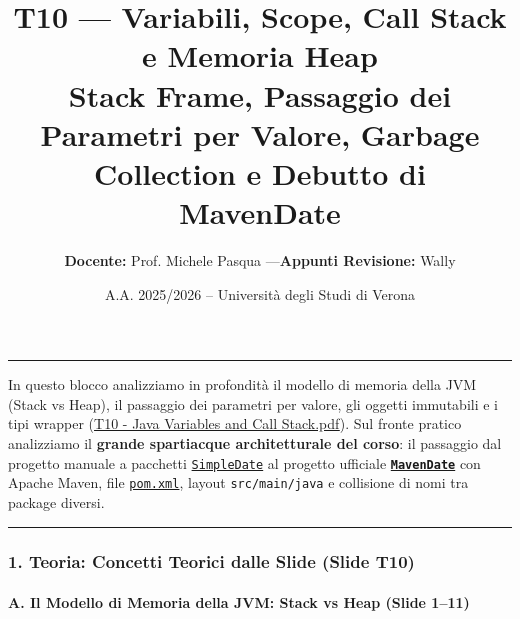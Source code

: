 \documentclass[11pt,a4paper]{article}
\title{\Huge\bfseries\sffamily\color{brandblue} T10 --- Variabili, Scope, Call Stack e Memoria Heap \\[0.3em] \large\sffamily Stack Frame, Passaggio dei Parametri per Valore, Garbage Collection e Debutto di MavenDate}
\author{\textbf{Docente:} Prof. Michele Pasqua \quad---\quad \textbf{Appunti Revisione:} Wally}
\date{A.A. 2025/2026 -- Universit\`a degli Studi di Verona}
\newcommand{\passthrough}[1]{#1}
\begin{document}
\maketitle
\thispagestyle{fancy}
\vspace{-1.2em}
\noindent\textcolor{brandblue}{\rule{\textwidth}{0.8pt}}
\vspace{1.2em}

In questo blocco analizziamo in profondità il modello di memoria della
JVM (Stack vs Heap), il passaggio dei parametri per valore, gli oggetti
immutabili e i tipi wrapper
(\href{file:///home/wally/Documenti/GitHub/Programmazione-II/25-26/Teoria-e-Esercitazioni/Slides-20260902/T10\%20-\%20Java\%20Variables\%20and\%20Call\%20Stack.pdf}{T10
- Java Variables and Call Stack.pdf}). Sul fronte pratico analizziamo il
\textbf{grande spartiacque architetturale del corso}: il passaggio dal
progetto manuale a pacchetti
\href{file:///home/wally/Documenti/GitHub/Programmazione-II/25-26/Teoria-e-Esercitazioni/Codice-20260902/Lezione10/SimpleDate}{\passthrough{\lstinline!SimpleDate!}}
al progetto ufficiale
\textbf{\href{file:///home/wally/Documenti/GitHub/Programmazione-II/25-26/Teoria-e-Esercitazioni/Codice-20260902/Lezione10/MavenDate}{\passthrough{\lstinline!MavenDate!}}}
con Apache Maven, file
\href{file:///home/wally/Documenti/GitHub/Programmazione-II/25-26/Teoria-e-Esercitazioni/Codice-20260902/Lezione10/MavenDate/pom.xml}{\passthrough{\lstinline!pom.xml!}},
layout \passthrough{\lstinline!src/main/java!} e collisione di nomi tra
package diversi.

\begin{center}\rule{0.5\linewidth}{0.5pt}\end{center}

\subsubsection{1. Teoria: Concetti Teorici dalle Slide (Slide
T10)}\label{teoria-concetti-teorici-dalle-slide-slide-t10}

\paragraph{A. Il Modello di Memoria della JVM: Stack vs Heap (Slide
1--11)}\label{a.-il-modello-di-memoria-della-jvm-stack-vs-heap-slide-111}
\end{document}

